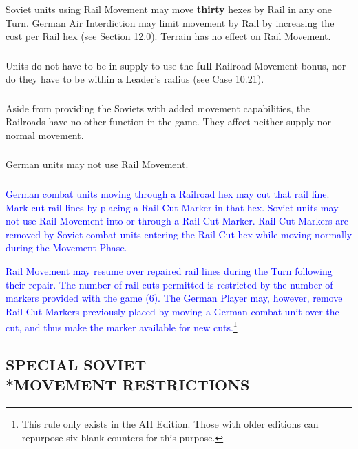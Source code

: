 \subsubsection{} Soviet units using Rail Movement may move \textbf{thirty} hexes by Rail in any one Turn. German Air Interdiction may limit movement by Rail by increasing the cost per Rail hex (see Section 12.0). Terrain has no effect on Rail Movement.

\subsubsection{} Units do not have to be in supply to use the \textbf{full} Railroad Movement bonus, nor do they have to be within a Leader's radius (see Case 10.21).

\subsubsection{} Aside from providing the Soviets with added movement capabilities, the Railroads have no other function in the game. They affect neither supply nor normal movement.

\subsubsection{} German units may not use Rail Movement.
\nobreak
\textcolor{blue}{\subsubsection{} German combat units moving through a Railroad hex may cut that rail line.  Mark cut rail lines by placing a
Rail Cut Marker in that hex. Soviet units may not use Rail Movement into or through a Rail Cut Marker.  Rail Cut Markers are removed by
Soviet combat units entering the Rail Cut hex while moving normally during the Movement Phase.}

\textcolor{blue}{Rail Movement may resume over repaired rail lines during the Turn following their repair.  The number of rail cuts permitted is restricted by the number of markers provided with the game (6).  The German Player may, however, remove Rail Cut Markers previously placed by moving a German combat unit over the cut, and thus make the marker available for new cuts.}\footnote{This rule only exists in the AH Edition. Those with older editions can repurpose six blank counters for this purpose.}

\subsection{SPECIAL SOVIET\\*MOVEMENT RESTRICTIONS}

